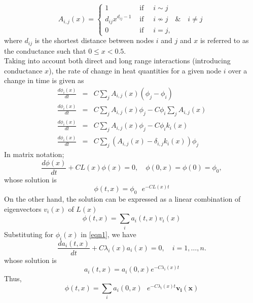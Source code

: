 \documentclass[10pt,a4paper]{article}
\begin{document}
\begin{equation*}
A_{i,j}(x) =  
\begin{cases} 
1 &\text{ if } \quad   i \sim j\\
d_{ij} x^{d_{ij}-1} & \text{ if } \quad   i\nsim j \quad  \&  \quad i\neq j \\
0 & \text{ if } \quad  i = j,
\end{cases}
\end{equation*}
where $d_{ij}$ is the shortest distance between nodes $i$ and $j$ and  $x$ is referred to as the conductance such that $0 \leq x < 0.5$.\\
Taking into account both direct and long range interactions (introducing conductance $x$), the rate of change in heat quantities for a given node $i$ over a change in time is given as 
\begin{eqnarray*}
\frac{d\phi_{i}(x)}{dt} &=& C \sum_{j} A_{i,j}(x) (\phi_j - \phi_i)\\
\frac{d\phi_{i}(x)}{dt} &=& C \sum_{j} A_{i,j}(x) \phi_j - C \phi_i \sum_{j} A_{i,j}(x)\\
\frac{d\phi_{i}(x)}{dt} &=& C \sum_{j} A_{i,j}(x) \phi_j - C \phi_i k_{i}(x)\\
\frac{d\phi_{i}(x)}{dt} &=& C \sum_{j} (A_{i,j}(x) - \delta_{i,j} k_{i}(x)) \phi_j
\end{eqnarray*}
In matrix notation;
\begin{equation}
\frac{d\phi(x)}{dt} + CL(x) \phi(x) = 0, \quad \phi(0,x) = \phi(0) = \phi_{0} ,
\label{eqn1}
\end{equation}
whose solution is
\begin{equation*}
\phi(t,x)  = \phi_0 \text{  } e^{-CL(x)t}
\end{equation*}
On the other hand, the solution can be expressed as a linear combination of eigenvectors $v_{i}(x)$ of $L(x)$ \\
\begin{equation*}
\phi(t,x)  = \sum_i a_{i}(t,x) v_{i} (x)
\end{equation*}
Substituting for $\phi_{i}(x)$ in \ref{eqn1}, we have
\begin{equation*}
\frac{d a_{i}(t,x)}{dt} + C\lambda_{i}(x) a_{i}(x) = 0, \quad i = 1, \hdots, n.
\end{equation*}
whose solution is\\
\begin{equation}
a_{i}(t,x) = a_{i}(0,x) e^{-C \lambda_{i}(x) t}
\label{eqn:2}
\end{equation}
Thus,
\begin{equation*}
\phi(t,x) = \sum_{i} a_{i}(0,x) \text{ } e^{-C \lambda_{i}(x) t} \mathbf{v_{i}(x)}
\end{equation*}
\end{document}
